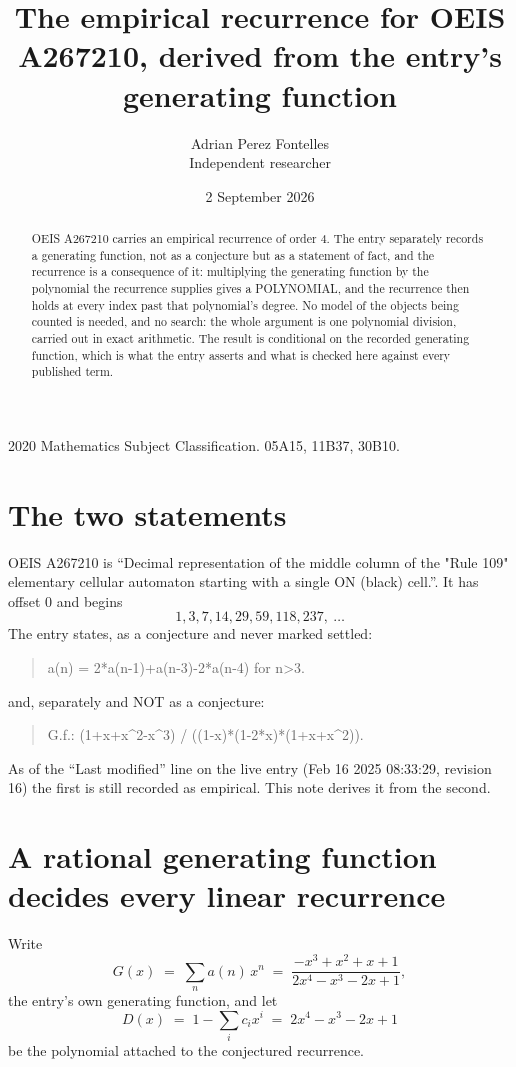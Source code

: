 \documentclass[11pt,a4paper]{article}
\title{The empirical recurrence for OEIS A267210, derived from the entry's generating function}
\author{Adrian Perez Fontelles\\ \small Independent researcher}
\date{2 September 2026}
\theoremstyle{plain}
\theoremstyle{definition}
\begin{document}
\maketitle

\begin{abstract}
OEIS A267210 carries an empirical recurrence of order $4$. The entry separately records a
generating function, not as a conjecture but as a statement of fact, and the recurrence is a
consequence of it: multiplying the generating function by the polynomial the recurrence
supplies gives a POLYNOMIAL, and the recurrence then holds at every index past that
polynomial's degree. No model of the objects being counted is needed, and no search: the
whole argument is one polynomial division, carried out in exact arithmetic. The result is
conditional on the recorded generating function, which is what the entry asserts and what is
checked here against every published term.
\end{abstract}

\noindent\small 2020 Mathematics Subject Classification. 05A15, 11B37, 30B10.\normalsize

\section{The two statements}

OEIS A267210 is ``Decimal representation of the middle column of the "Rule 109" elementary cellular automaton starting with a single ON (black) cell.''. It has offset $0$ and begins
\[
1, 3, 7, 14, 29, 59, 118, 237,\ \dots
\]
The entry states, as a conjecture and never marked settled:
\begin{quote}
a(n) = 2*a(n-1)+a(n-3)-2*a(n-4) for n>3.
\end{quote}
and, separately and NOT as a conjecture:
\begin{quote}
G.f.: (1+x+x\^{}2-x\^{}3) / ((1-x)*(1-2*x)*(1+x+x\^{}2)).
\end{quote}
As of the ``Last modified'' line on the live entry (Feb 16 2025 08:33:29, revision 16) the first is still
recorded as empirical. This note derives it from the second.

\section{A rational generating function decides every linear recurrence}

Write
\[
G(x)\;=\;\sum_{n}a(n)\,x^{n}\;=\;\frac{- x^{3} + x^{2} + x + 1}{2 x^{4} - x^{3} - 2 x + 1},
\]
the entry's own generating function, and let
\[
D(x)\;=\;1-\sum_i c_i x^{i}\;=\;2 x^{4} - x^{3} - 2 x + 1
\]
be the polynomial attached to the conjectured recurrence.
\end{document}
